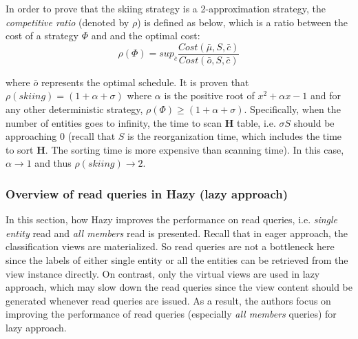 In order to prove that the skiing strategy is a 2-approximation strategy, the {\em competitive ratio} (denoted by $\rho$) is defined as below, which is a ratio between the cost of a strategy $\Phi$ and and the optimal cost:
\begin{equation}
    \rho(\Phi) = sup_{\bar{c}}\frac{Cost(\bar{\mu}, S, \bar{c})}{Cost(\bar{o}, S, \bar{c})}
\end{equation}


where $\bar{o}$ represents the optimal schedule. It is proven that $\rho(skiing) = (1+\alpha + \sigma)$ where $\alpha$ is the positive root of $x^2 + \alpha x - 1$ and for any other deterministic strategy, $\rho(\Phi) \geq (1+\alpha + \sigma)$. Specifically, when the number of entities goes to infinity, the time to scan $\textbf{H}$ table, i.e. $\sigma S$ should be approaching 0 (recall that $S$ is the reorganization time, which includes the time to sort $\textbf{H}$. The sorting time is more expensive than scanning time). In this case, $\alpha \rightarrow 1$ and thus $\rho(skiing) \rightarrow 2$.

% 




\subsubsection{Overview of read queries in Hazy (lazy approach)}
In this section, how Hazy improves the performance on read queries, i.e. {\em single entity} read and {\em all members} read is presented. Recall that in eager approach, the classification views are materialized. So read queries are not a bottleneck here since the labels of either single entity or all the entities can be retrieved from the view instance directly. On contrast, only the virtual views are used in lazy approach, which may slow down the read queries since the view content should be generated whenever read queries are issued. As a result, the authors focus on improving the performance of read queries (especially {\em all members} queries) for lazy approach.

